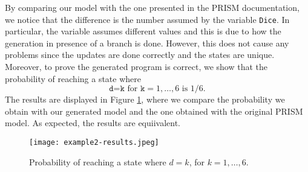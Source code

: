 By comparing our model with the one presented in the PRISM documentation, we notice that the difference is the number assumed by the variable {\tt Dice}. 
In particular, the variable assumes different values and 
this is due to how the generation in presence of a branch is done. 
However, this does not cause any problems since the updates are done correctly and the states are unique.
Moreover,  to prove the generated program is correct, we show that the probability of reaching a state where 
$$\texttt{d=k} \text{ for } \texttt{k}=1,\ldots,6 \text{ is } 1/6.$$
The results are displayed in Figure \ref{ex1-res}, where we compare the probability we obtain with our generated model
and the one obtained with the original PRISM model. 
As expected, the results are equiivalent.
\begin{figure}[h]
\centering
\texttt{[image: example2-results.jpeg]}	
\caption{Probability of reaching a state where $d=k$, for $k=1,\ldots,6.$}
\label{ex1-res}
\end{figure}
